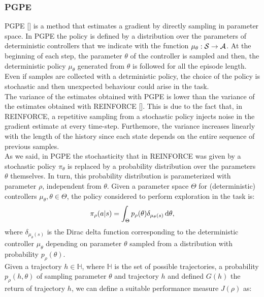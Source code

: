 \subsubsection{\ac{PGPE}} \label{subsec:pgpe}
\acf{PGPE} [\cite{sehnke2008PolicyGradient}] is a method that estimates a gradient by directly sampling in parameter space. In \ac{PGPE} the policy is defined by a distribution over the parameters of deterministic controllers that we indicate with the function $\mu_{\theta}: \mathcal{S} \to \mathcal{A}$. At the beginning of each step, the parameter $\theta$ of the controller is sampled and then, the deterministic policy $\mu_{\theta}$ generated from $\theta$ is followed for all the episode length. Even if samples are collected with a detrministic policy, the choice of the policy is stochastic and then unexpected behaviour could arise in the task.\\
\newline
The variance of the estimates obtained with \ac{PGPE} is lower than the variance of the estimates obtained with REINFORCE [\cite{zhao2013efficient}]. This is due to the fact that, in REINFORCE, a repetitive sampling from a stochastic policy injects noise in the gradient estimate at every time-step. Furthemore, the variance increases linearly with the length of the history since each state depends on the entire sequence of previous samples.\\
\newline
As we said, in \ac{PGPE} the stochasticity that in REINFORCE was given by a stochastic policy $\pi_{\theta}$ is replaced by a probability distribution over the parameters $\theta$ themselves. In turn, this probability distribution is parameterized with parameter $\rho$, independent from $\theta$. Given a parameter space $\Theta$ for (deterministic) controllers $\mu_{\theta}, \theta \in \Theta$, the policy considered to perform exploration in the task is:
\begin{align}
\pi_{\rho}(a|s) = \int_{\Theta} p_{\rho}(\theta) \delta_{\mu_{\theta}(s)}\,\mathrm{d} \theta,
\end{align}
where $\delta_{\mu_{\theta}(s)}$ is the Dirac delta function corresponding to the deterministic controller $\mu_{\theta}$ depending on parameter $\theta$ sampled from a distribution with probability $p_{\rho}(\theta)$.\\
\newline
Given a trajectory $h \in \mathbb{H}$, where $\mathbb{H}$ is the set of possible trajectories, a probability $p_{\rho}(h, \theta)$ of sampling parameter $\theta$ and trajectory $h$ and defined $G(h)$ the return of trajectory $h$, we can define a suitable performance measure $J(\rho)$ as:
